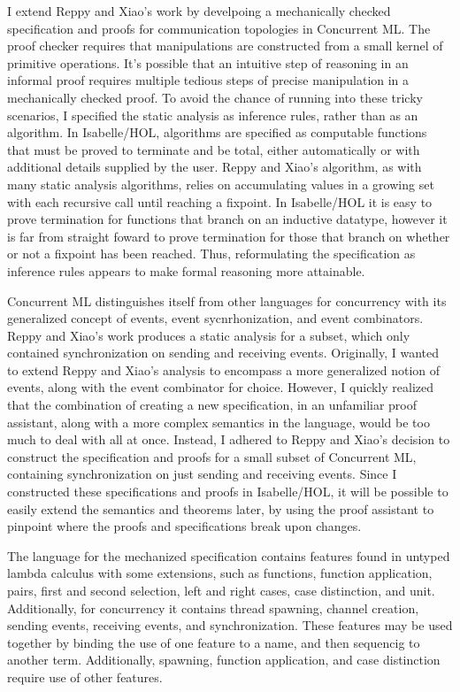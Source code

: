 \documentclass[letterpaper, 11pt]{extarticle}
\begin{document}
I extend Reppy and Xiao's work by develpoing a mechanically checked specification and proofs
for communication topologies in Concurrent ML. The proof checker requires that manipulations are
constructed from a small kernel of primitive operations. It's possible that an intuitive step of reasoning in an
informal proof requires multiple tedious steps of precise manipulation in a mechanically checked proof.
To avoid the chance of running into these tricky scenarios, I specified the static analysis
as inference rules, rather than as an algorithm. In Isabelle/HOL, algorithms are specified as computable functions
that must be proved to terminate and be total, either automatically or with additional details supplied by the user.
Reppy and Xiao's algorithm, as with many static analysis algorithms, relies on accumulating values in a growing set
with each recursive call until reaching a fixpoint.
In Isabelle/HOL it is easy to prove termination for functions that branch on an inductive datatype, 
however it is far from straight foward to prove termination for those that branch on
whether or not a fixpoint has been reached. Thus, reformulating the specification as inference rules
appears to make formal reasoning more attainable. 

Concurrent ML distinguishes itself from other languages for concurrency with its generalized concept of events,
event sycnrhonization, and event combinators. Reppy and Xiao's work produces a static analysis for a subset,
which only contained synchronization on sending and receiving events. Originally, I wanted to extend Reppy and Xiao's
analysis to encompass a more generalized notion of events, along with the event combinator for choice.
However, I quickly
realized that the combination of creating a new specification, in an unfamiliar proof assistant, along with a more complex
semantics in the language, would be too much to deal with all at once. Instead, I adhered to Reppy and Xiao's decision
to construct the specification and proofs for a small subset of Concurrent ML, containing synchronization on just
sending and receiving events. Since I constructed these specifications and proofs in Isabelle/HOL, it will be possible
to easily extend the semantics and theorems later, by using the proof assistant to pinpoint where the proofs and
specifications break upon changes.

The language for the mechanized specification contains features found in untyped lambda calculus with
some extensions, such as functions, function application, pairs, first and second selection, left and right cases, case distinction, 
and unit. 
Additionally, for concurrency it contains thread spawning, channel creation, sending events, receiving events, and synchronization.
These features may be used together by binding the use of one feature to a name, and then
sequencig to another term. Additionally, spawning, function application, and case distinction require use of other features.
\end{document}
